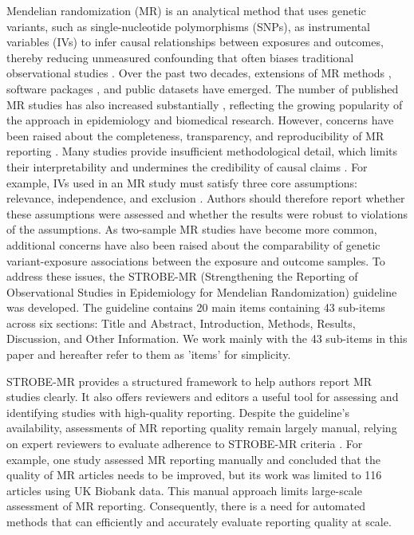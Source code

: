 


Mendelian randomization (MR) is an analytical method that uses genetic variants, such as single-nucleotide polymorphisms (SNPs), as instrumental variables (IVs) to infer causal relationships between exposures and outcomes, thereby reducing unmeasured confounding that often biases traditional observational studies \cite{smith_mendelian_2003, Nguyen2024, Davies2018}. Over the past two decades, extensions of MR methods \cite{Burgess2015, burgess_guidelines_2023, burgess_network_2015}, software packages \cite{hemani_mr-base_2018}, and public datasets \cite{sudlow_uk_2015} have emerged. The number of published MR studies has also increased substantially \cite{He2025}, reflecting the growing popularity of the approach in epidemiology and biomedical research. However, concerns have been raised about the completeness, transparency, and reproducibility of MR reporting \cite{skrivankova_strengthening_2021}. Many studies provide insufficient methodological detail, which limits their interpretability and undermines the credibility of causal claims \cite{davies_issues_2013,islam_reporting_2022}. For example, IVs used in an MR study must satisfy three core assumptions: relevance, independence, and exclusion \cite{VanderWeele2014}. Authors should therefore report whether these assumptions were assessed and whether the results were robust to violations of the assumptions. As two-sample MR studies have become more common, additional concerns have also been raised about the comparability of genetic variant-exposure associations between the exposure and outcome samples. To address these issues, the STROBE-MR (Strengthening the Reporting of Observational Studies in Epidemiology for Mendelian Randomization) guideline was developed\cite{skrivankova_strengthening_2021}. The guideline contains 20 main items containing 43 sub-items across six sections: Title and Abstract, Introduction, Methods, Results, Discussion, and Other Information. We work mainly with the 43 sub-items in this paper and hereafter refer to them as 'items' for simplicity.

STROBE-MR provides a structured framework to help authors report MR studies clearly. It also offers reviewers and editors a useful tool for assessing and identifying studies with high-quality reporting\cite{zuo_systematic_2026, cui_genetically_2025}. Despite the guideline's availability, assessments of MR reporting quality remain largely manual, relying on expert reviewers to evaluate adherence to STROBE-MR criteria \cite{li_causal_2025}. For example, one study \cite{gibson_reporting_2023} assessed MR reporting manually and concluded that the quality of MR articles needs to be improved, but its work was limited to 116 articles using UK Biobank data. This manual approach limits large-scale assessment of MR reporting. Consequently, there is a need for automated methods that can efficiently and accurately evaluate reporting quality at scale.

